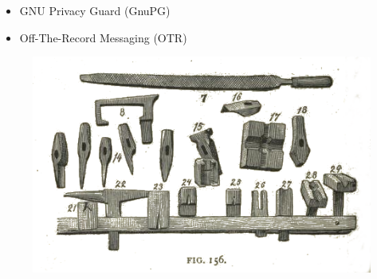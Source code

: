 \documentclass[presentation]{beamer}
\begin{document}


\section{}

\begin{frame}{}
  \begin{itemize}
  \item GNU Privacy Guard (GnuPG)
  \item Off-The-Record Messaging (OTR)
  \end{itemize}
  \begin{figure}[htb]
    \centering
    \includegraphics[height=0.6\textheight]{hammer-02.png}
  \end{figure}
\end{frame}



\section{}
\end{document}
